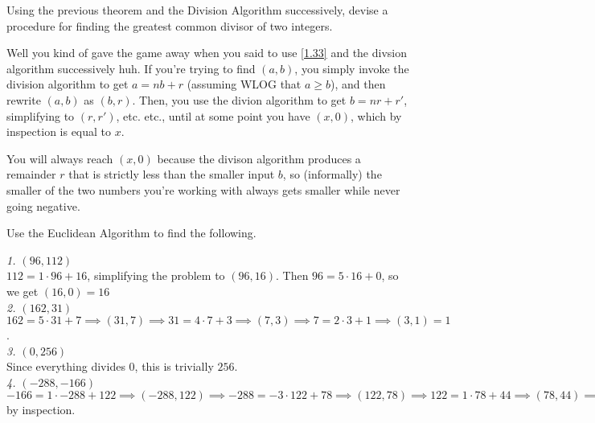 \documentclass[../main.tex]{subfiles}
\begin{document}
\begin{ex} \label{1.35}
  Using the previous theorem and the Division Algorithm successively, devise a procedure for finding the greatest common divisor of two integers.
\end{ex}

Well you kind of gave the game away when you said to use \ref{1.33} and the divsion algorithm successively huh. If you're trying to find $(a, b)$, you simply invoke the division algorithm to get $a = nb + r$ (assuming WLOG that $a \geq b$), and then rewrite $(a, b)$ as $(b, r)$. Then, you use the divion algorithm to get $b = nr + r'$, simplifying to $(r, r')$, etc. etc., until at some point you have $(x, 0)$, which by inspection is equal to $x$.

You will always reach $(x, 0)$ because the divison algorithm produces a remainder $r$ that is strictly less than the smaller input $b$, so (informally) the smaller of the two numbers you're working with always gets smaller while never going negative.



\begin{ex} \label{1.36}
  Use the Euclidean Algorithm to find the following.
\end{ex}

\hspace*{5mm} \emph{1. $(96, 112)$} \\
\hspace*{15mm} $112 = 1 \cdot 96 + 16$, simplifying the problem to $(96, 16)$. Then $96 = 5 \cdot 16 + 0$, so we get $(16, 0) = 16$ \\

\hspace*{5mm} \emph{2. $(162, 31)$} \\
\hspace*{15mm} $162 = 5 \cdot 31 + 7 \implies (31, 7) \implies 31 = 4 \cdot 7 + 3 \implies (7, 3) \implies 7 = 2 \cdot 3 + 1 \implies (3, 1) = 1$. \\

\hspace*{5mm} \emph{3. $(0, 256)$} \\
\hspace*{15mm} Since everything divides $0$, this is trivially $256$. \\

\hspace*{5mm} \emph{4. $(-288,-166)$} \\
\hspace*{15mm} $-166 = 1 \cdot -288 + 122 \implies (-288, 122) \implies -288 = -3 \cdot 122 + 78 \implies (122, 78) \implies 122 = 1 \cdot 78 + 44 \implies (78, 44) \implies 78 = 1 \cdot 44 + 34 \implies (44, 34)
\implies 44 = 1 \cdot 34 + 10 \implies (34, 10) = 2$ by inspection.  \\
\end{document}
